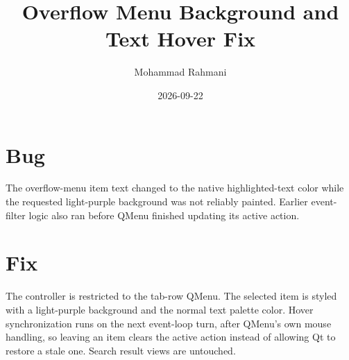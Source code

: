 \documentclass[a4paper]{article}
\title{Overflow Menu Background and Text Hover Fix}
\date{2026-09-22}
\author{Mohammad Rahmani}
\begin{document}
   \maketitle

   \begin{preview}
      \section{Bug}
      The overflow-menu item text changed to the native highlighted-text color
      while the requested light-purple background was not reliably painted.
      Earlier event-filter logic also ran before QMenu finished updating its
      active action.

      \section{Fix}
      The controller is restricted to the tab-row QMenu.  The selected item is
      styled with a light-purple background and the normal text palette color.
      Hover synchronization runs on the next event-loop turn, after QMenu's own
      mouse handling, so leaving an item clears the active action instead of
      allowing Qt to restore a stale one.  Search result views are untouched.
   \end{preview}

   
   
\end{document}
